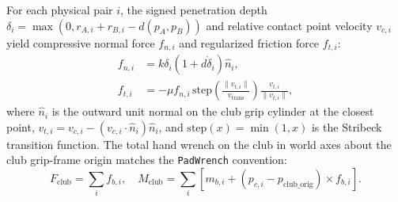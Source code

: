 \documentclass[11pt,a4paper]{article}
\begin{document}
For each physical pair $i$, the signed penetration depth $\delta_i = \max(0, r_{A,i} + r_{B,i} - d(p_A, p_B))$ and relative contact point
velocity $v_{c,i}$ yield compressive normal force $f_{n,i}$ and regularized friction force $f_{t,i}$:
\begin{align}
f_{n,i} &= k \delta_i \left(1 + d \dot{\delta}_i\right) \hat{n}_i, \\
f_{t,i} &= -\mu f_{n,i} \, \mathrm{step}\left(\frac{\|v_{t,i}\|}{v_{\mathrm{trans}}}\right) \frac{v_{t,i}}{\|v_{t,i}\|},
\end{align}
where $\hat{n}_i$ is the outward unit normal on the club grip cylinder at the closest point, $v_{t,i} = v_{c,i} - (v_{c,i} \cdot \hat{n}_i)\hat{n}_i$,
and $\mathrm{step}(x) = \min(1, x)$ is the Stribeck transition function.
The total hand wrench on the club in world axes about the club grip-frame origin matches the \texttt{PadWrench} convention:
\begin{equation}
F_{\mathrm{club}} = \sum_{i} f_{b,i}, \quad
M_{\mathrm{club}} = \sum_{i} \left[ m_{b,i} + (p_{c,i} - p_{\mathrm{club\_orig}}) \times f_{b,i} \right].
\end{equation}
\end{document}
